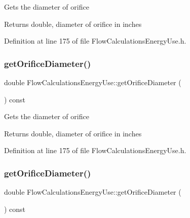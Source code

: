 Gets the diameter of orifice

\begin{DoxyReturn}{Returns}
double, diameter of orifice in inches 
\end{DoxyReturn}


Definition at line 175 of file Flow\+Calculations\+Energy\+Use.\+h.

\mbox{\label{class_flow_calculations_energy_use_a71c34f09ec3524db321b8934930700c5}} 
\subsubsection{\texorpdfstring{get\+Orifice\+Diameter()}{getOrificeDiameter()}\hspace{0.1cm}{\footnotesize\ttfamily [2/3]}}
{\footnotesize\ttfamily double Flow\+Calculations\+Energy\+Use\+::get\+Orifice\+Diameter (\begin{DoxyParamCaption}{ }\end{DoxyParamCaption}) const\hspace{0.3cm}{\ttfamily [inline]}}

Gets the diameter of orifice

\begin{DoxyReturn}{Returns}
double, diameter of orifice in inches 
\end{DoxyReturn}


Definition at line 175 of file Flow\+Calculations\+Energy\+Use.\+h.

\mbox{\label{class_flow_calculations_energy_use_a71c34f09ec3524db321b8934930700c5}} 
\subsubsection{\texorpdfstring{get\+Orifice\+Diameter()}{getOrificeDiameter()}\hspace{0.1cm}{\footnotesize\ttfamily [3/3]}}
{\footnotesize\ttfamily double Flow\+Calculations\+Energy\+Use\+::get\+Orifice\+Diameter (\begin{DoxyParamCaption}{ }\end{DoxyParamCaption}) const\hspace{0.3cm}{\ttfamily [inline]}}


